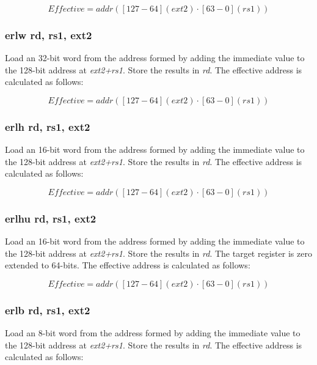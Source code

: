 \documentclass{article}
\begin{document}
\begin{equation}
Effective = addr([127-64](ext2) \cdot [63-0](rs1))
\end{equation}

\subsubsection{erlw rd, rs1, ext2}

Load an 32-bit word from the address formed by adding the immediate value to the 
128-bit address at \textit{ext2+rs1}.  Store the results in \textit{rd}.  
The effective address is calculated as follows:

\begin{equation}
Effective = addr([127-64](ext2) \cdot [63-0](rs1))
\end{equation}

\subsubsection{erlh rd, rs1, ext2}

Load an 16-bit word from the address formed by adding the immediate value to the 
128-bit address at \textit{ext2+rs1}.  Store the results in \textit{rd}.  
The effective address is calculated as follows:

\begin{equation}
Effective = addr([127-64](ext2) \cdot [63-0](rs1))
\end{equation}

\subsubsection{erlhu rd, rs1, ext2}

Load an 16-bit word from the address formed by adding the immediate value to the 
128-bit address at \textit{ext2+rs1}.  Store the results in \textit{rd}.  
 The target register is zero extended to 64-bits.  The effective 
address is calculated as follows:

\begin{equation}
Effective = addr([127-64](ext2) \cdot [63-0](rs1))
\end{equation}

\subsubsection{erlb rd, rs1, ext2}

Load an 8-bit word from the address formed by adding the immediate value to the 
128-bit address at \textit{ext2+rs1}.  Store the results in \textit{rd}.  
The effective address is calculated as follows: 
\end{document}
